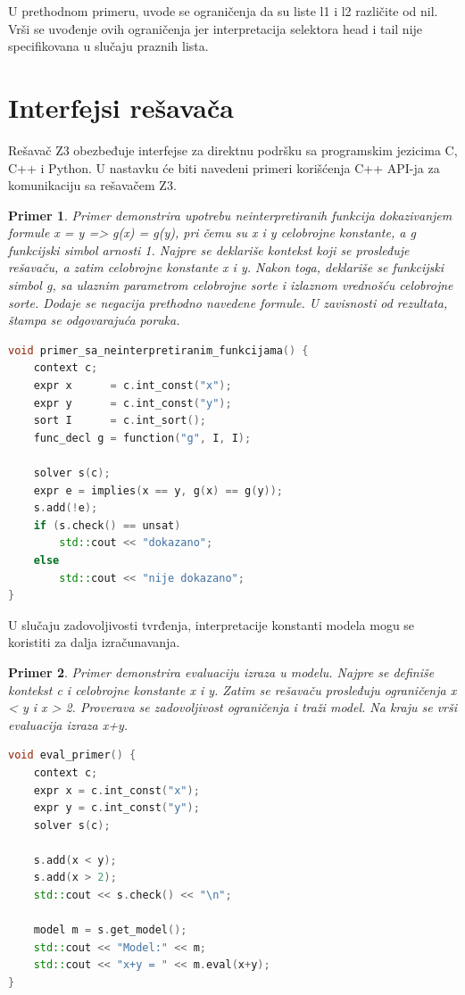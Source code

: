 \documentclass[12pt,oneside]{memoir}
\newtheorem{primer}{Primer}
\begin{document}
U prethodnom primeru, uvode se ograničenja da su liste l1 i l2 različite od nil. Vrši se uvođenje ovih ograničenja jer interpretacija selektora head i tail 
nije specifikovana u slučaju praznih lista.


\section{Interfejsi rešavača}  \label{sec:num4}
Rešavač Z3 obezbeđuje interfejse za direktnu podršku sa programskim jezicima C, C++ i Python. U nastavku će biti navedeni primeri korišćenja C++ API-ja za komunikaciju sa rešavačem Z3.

\begin{primer} Primer demonstrira upotrebu neinterpretiranih funkcija dokazivanjem formule x = y => g(x) = g(y), pri čemu su x i y celobrojne konstante, a g funkcijski simbol arnosti 1. Najpre se deklariše kontekst koji se prosleđuje rešavaču, a zatim celobrojne konstante x i y. Nakon toga, deklariše se funkcijski simbol g, sa ulaznim parametrom celobrojne sorte i izlaznom vrednošću celobrojne sorte. Dodaje se negacija prethodno navedene formule. U zavisnosti od rezultata, štampa se odgovarajuća poruka.\\
\begin{lstlisting}[language=C++]
void primer_sa_neinterpretiranim_funkcijama() { 
    context c;
    expr x      = c.int_const("x");
    expr y      = c.int_const("y");
    sort I      = c.int_sort();
    func_decl g = function("g", I, I);
    
    solver s(c);
    expr e = implies(x == y, g(x) == g(y));
    s.add(!e);
    if (s.check() == unsat) 
        std::cout << "dokazano";
    else
        std::cout << "nije dokazano";
}
\end{lstlisting}
\end{primer}\par
U slučaju zadovoljivosti tvrđenja, interpretacije konstanti modela mogu se koristiti za dalja izračunavanja.
\begin{primer} Primer demonstrira evaluaciju izraza u modelu. Najpre se definiše kontekst c i celobrojne konstante x i y. Zatim se rešavaču prosleđuju ograničenja x < y i x > 2. Proverava se zadovoljivost ograničenja i traži model. Na kraju se vrši evaluacija izraza x+y. 
\begin{lstlisting}[language=C++]
void eval_primer() {
    context c;
    expr x = c.int_const("x");
    expr y = c.int_const("y");
    solver s(c);

    s.add(x < y);
    s.add(x > 2);
    std::cout << s.check() << "\n";
    
    model m = s.get_model();
    std::cout << "Model:" << m;
    std::cout << "x+y = " << m.eval(x+y);
}
\end{lstlisting}
\end{primer}\par
\end{document}
